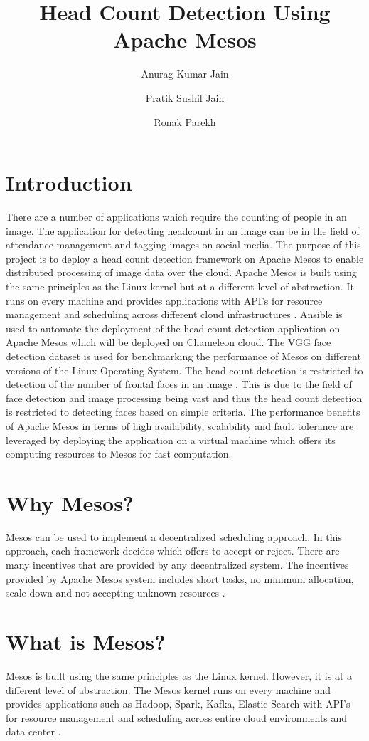\documentclass[9pt,twocolumn,twoside]{../../styles/osajnl}
\title{Head Count Detection Using Apache Mesos}
\author[1,*]{Anurag Kumar Jain}
\author[1,*]{Pratik Sushil Jain}
\author[1,*]{Ronak Parekh}
\affil[1]{School of Informatics and Computing, Bloomington, IN 47408, U.S.A.}
\affil[*]{Corresponding authors: jainanur@iu.edu, jainps@iu.edu, parekhr@iu.edu}
\begin{document}
\maketitle

\section{Introduction}
There are a number of applications which require the counting of
people in an image. The application for detecting headcount in an
image can be in the field of attendance management and tagging images
on social media. The purpose of this project is to deploy a head count
detection framework on Apache Mesos to enable distributed processing
of image data over the cloud. Apache Mesos is built using the same
principles as the Linux kernel but at a different level of
abstraction. It runs on every machine and provides applications with
API's for resource management and scheduling across different cloud
infrastructures \cite{www-mesos}. Ansible is used to automate the
deployment of the head count detection application on Apache Mesos
which will be deployed on Chameleon cloud. The VGG face detection
dataset is used for benchmarking the performance of Mesos on different
versions of the Linux Operating System. The head count detection is
restricted to detection of the number of frontal faces in an image
\cite{www-face-detection-wikipedia}. This is due to the field of face
detection and image processing being vast and thus the head count
detection is restricted to detecting faces based on simple
criteria. The performance benefits of Apache Mesos in terms of high
availability, scalability and fault tolerance are leveraged by
deploying the application on a virtual machine which offers its
computing resources to Mesos for fast computation.

\section{Why Mesos?}
Mesos can be used to implement a decentralized scheduling approach. In
this approach, each framework decides which offers to accept or
reject. There are many incentives that are provided by any
decentralized system. The incentives provided by Apache Mesos system
includes short tasks, no minimum allocation, scale down and not
accepting unknown resources \cite{www-mesos-paper}.

\section{What is Mesos?}
Mesos is built using the same principles as the Linux kernel. However,
it is at a different level of abstraction. The Mesos kernel runs on
every machine and provides applications such as Hadoop, Spark, Kafka,
Elastic Search with API's for resource management and scheduling
across entire cloud environments and data center \cite{www-mesos-paper}.
\end{document}
